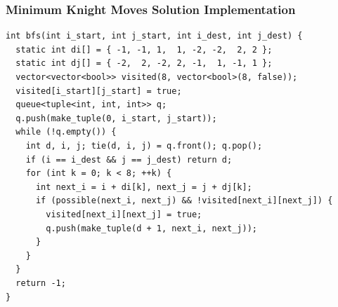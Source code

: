 \documentclass{beamer}
\begin{document}
\begin{frame}[containsverbatim]
\frametitle{Minimum Knight Moves Solution Implementation}
\scriptsize
\begin{lstlisting}
int bfs(int i_start, int j_start, int i_dest, int j_dest) {
  static int di[] = { -1, -1, 1,  1, -2, -2,  2, 2 };
  static int dj[] = { -2,  2, -2, 2, -1,  1, -1, 1 };
  vector<vector<bool>> visited(8, vector<bool>(8, false));
  visited[i_start][j_start] = true;
  queue<tuple<int, int, int>> q;
  q.push(make_tuple(0, i_start, j_start));
  while (!q.empty()) {
    int d, i, j; tie(d, i, j) = q.front(); q.pop();
    if (i == i_dest && j == j_dest) return d;
    for (int k = 0; k < 8; ++k) {
      int next_i = i + di[k], next_j = j + dj[k];
      if (possible(next_i, next_j) && !visited[next_i][next_j]) {
        visited[next_i][next_j] = true;
        q.push(make_tuple(d + 1, next_i, next_j));
      }
    }
  }
  return -1;
}
\end{lstlisting}

\end{frame}
\end{document}
